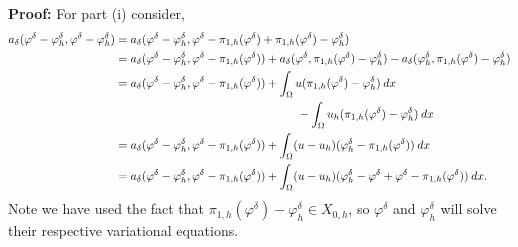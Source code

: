 \documentclass[11pt]{article}
\begin{document}
\vskip 1cm 


\textbf{Proof:} For part (i) consider,
\begin{align*}
    a_\delta(\varphi^\delta - \varphi^\delta_h, \varphi^\delta - \varphi^\delta_h) &= a_\delta(\varphi^\delta - \varphi^\delta_h, \varphi^\delta - \pi_{1,h}(\varphi^\delta) + \pi_{1,h}(\varphi^\delta) - \varphi^\delta_h) \\
    &= a_\delta(\varphi^\delta - \varphi^\delta_h, \varphi^\delta - \pi_{1,h}(\varphi^\delta)) + a_\delta(\varphi^\delta, \pi_{1,h}(\varphi^\delta) - \varphi^\delta_h) - a_\delta(\varphi^\delta_h, \pi_{1,h}(\varphi^\delta) - \varphi^\delta_h) \\
    &= a_\delta(\varphi^\delta - \varphi^\delta_h, \varphi^\delta - \pi_{1,h}(\varphi^\delta)) + \int_\Omega u(\pi_{1,h}(\varphi^\delta) - \varphi^\delta_h) \: dx \\
    &\hspace{5.5cm} - \int_\Omega u_h (\pi_{1,h}(\varphi^\delta) -  \varphi^\delta_h) \: dx \\
    &= a_\delta(\varphi^\delta - \varphi^\delta_h, \varphi^\delta - \pi_{1,h}(\varphi^\delta)) + \int_\Omega (u - u_h) (\varphi^\delta_h - \pi_{1,h}(\varphi^\delta)) \: dx \\
    &= a_\delta(\varphi^\delta - \varphi^\delta_h, \varphi^\delta - \pi_{1,h}(\varphi^\delta)) + \int_\Omega (u - u_h) (\varphi^\delta_h - \varphi^\delta + \varphi^\delta - \pi_{1,h}(\varphi^\delta)) \: dx.
\end{align*}
Note we have used the fact that $\pi_{1,h}(\varphi^\delta) - \varphi^\delta_h \in X_{0,h}$, so $\varphi^\delta$ and $\varphi^\delta_h$ will solve their respective variational equations. 
\end{document}
